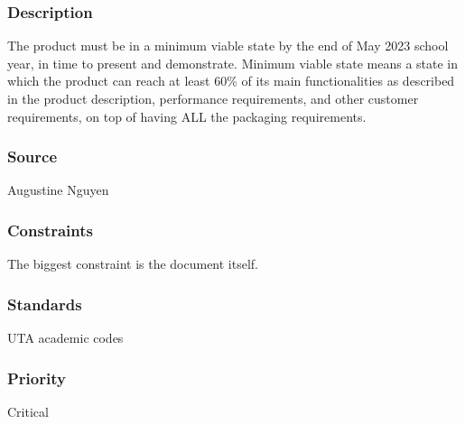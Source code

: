 \subsubsection{Description}
The product must be in a minimum viable state by the end of May 2023 school year, in time to present and demonstrate.  Minimum viable state means a state in which the product can reach at least 60\% of its main functionalities as described in the product description, performance requirements, and other customer requirements, on top of having ALL the packaging requirements.
\subsubsection{Source}
Augustine Nguyen
\subsubsection{Constraints}
The biggest constraint is the document itself.
\subsubsection{Standards}
UTA academic codes
\subsubsection{Priority}
Critical
